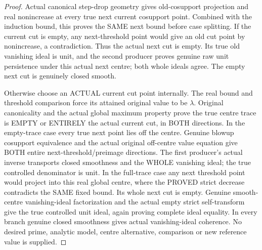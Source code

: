 \begin{proof}
Actual canonical step-drop geometry gives old-cosupport projection and real
nonincrease at every true next current cosupport point. Combined with the
induction bound, this proves the SAME next bound before case splitting.
If the current cut is empty, any next-threshold point would give an old cut
point by nonincrease, a contradiction. Thus the actual next cut is empty.
Its true old vanishing ideal is unit, and the second producer proves genuine
raw unit persistence under this actual next centre; both whole ideals agree.
The empty next cut is genuinely closed smooth.

Otherwise choose an ACTUAL current cut point internally. The real bound and
threshold comparison force its attained original value to be $\lambda$.
Original canonicality and the actual global maximum property prove the true
centre trace is EMPTY or ENTIRELY the actual current cut, in BOTH directions.
In the empty-trace case every true next point lies off the centre. Genuine
blowup cosupport equivalence and the actual original off-centre value equation
give BOTH entire next-threshold/preimage directions. The first producer's
actual inverse transports closed smoothness and the WHOLE vanishing ideal;
the true controlled denominator is unit. In the full-trace case any next
threshold point would project into this real global centre, where the PROVED
strict decrease contradicts the SAME fixed bound. Its whole next cut is
empty. Genuine smooth-centre vanishing-ideal factorization and the actual
empty strict self-transform give the true controlled unit ideal, again
proving complete ideal equality. In every branch genuine closed smoothness
gives actual vanishing-ideal coherence. No desired prime, analytic model,
centre alternative, comparison or new reference value is supplied.
\end{proof}
